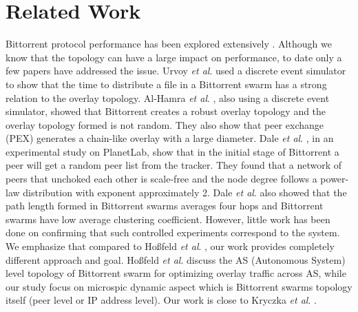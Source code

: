 \documentclass[paper]{ieice}
\begin{document}
\section{Related Work}\label{relatedworks}
Bittorrent protocol performance has been explored extensively \cite{guo2005measurements}\cite{legout2006rarest}\cite{pouwelse2004measurement}\cite{tian2007modeling}\cite{li2010measurement}\cite{zhang2010bittorrent}.  
Although we know that the topology can have a large impact on performance, to date only a few papers have addressed the issue.
Urvoy \textit{et al}. \cite{urvoy2007impact} used a discrete event simulator to show that the time to distribute a file in a Bittorrent swarm has a strong relation to the overlay topology.  
Al-Hamra \textit{et al}. \cite{al2007understanding}, also using a discrete event simulator, showed that Bittorrent creates a robust overlay topology and the overlay topology formed is not random. 
They also show that peer exchange (PEX) generates a chain-like overlay with a large diameter. 
Dale \textit{et al}. \cite{dale2008evolution}, in an experimental study on PlanetLab, show that in the initial stage of Bittorrent a peer will get a random peer list from the tracker. 
They found that a network of peers that unchoked each other is scale-free and the node degree follows a power-law distribution with exponent approximately 2. 
Dale \textit{et al}. \cite{dale2008evolution} also showed that the path length formed in Bittorrent swarms averages four hops and Bittorrent swarms have low average clustering coefficient.  
However, little work has been done on confirming that such controlled experiments correspond to the system. %
We emphasize that compared to Ho\ss{}feld \textit{et al}. \cite{TR464}, our work provides completely different approach and goal.
Ho\ss{}feld \textit{et al}. \cite{TR464} discuss the AS (Autonomous System) level topology of Bittorrent swarm for optimizing overlay traffic across AS, while our study focus on microspic dynamic aspect which is Bittorrent swarms topology itself (peer level or IP address level). 
Our work is close to Kryczka \textit{et al}. \cite{Kryczka2011}.
\end{document}
